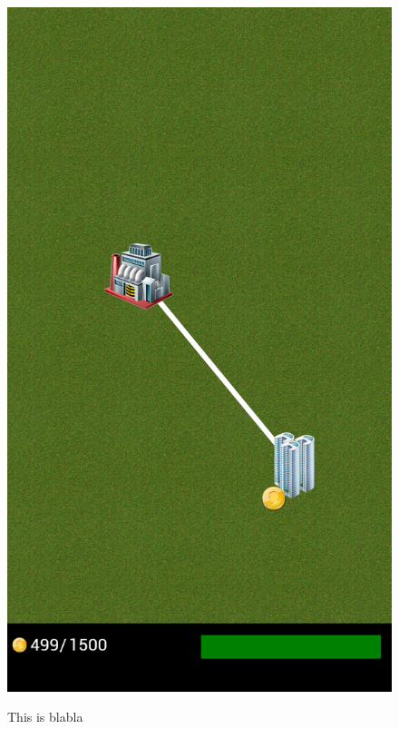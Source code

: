 \begin{figure}[H]
{		\includegraphics[scale=0.17]{pictures/sprint2-screen/sprint2-7}
	}
	\caption{This is blabla}
	\end{figure}


